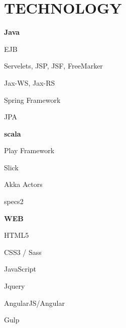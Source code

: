 \documentclass[paper=a4,fontsize=14pt]{article}
\let\olditemize\itemize
\let\endolditemize\enditemize
\renewenvironment{itemize}{%
    \small
    \olditemize
}{%
    \endolditemize
}
\newcommand{\NewPart}[1]{ \section*{\large \uppercase{#1}}}
\begin{document}
\NewPart{Technology}{}
\begin{multicols}{3}[]
\begin{itemize}[nolistsep]
	\item[] \hspace{-0.5cm} \textbf{Java}
    \item EJB
    \item Servelets, JSP, JSF, FreeMarker
    \item Jax-WS, Jax-RS
	\item Spring Framework
	\item JPA 
\end{itemize}
\columnbreak
\begin{itemize}[nolistsep]
	\item[] \hspace{-0.5cm} \textbf{scala} 
    \item Play Framework
    \item Slick
    \item Akka Actors
    \item specs2
\end{itemize}
\columnbreak
\begin{itemize}[nolistsep] 
	\item[] \hspace{-0.5cm} \textbf{WEB}
    \item HTML5
    \item CSS3 / Sass
    \item JavaScript 
    \item Jquery 
    \item AngularJS/Angular 
    \item Gulp 
\end{itemize}
\end{multicols}
\end{document}
